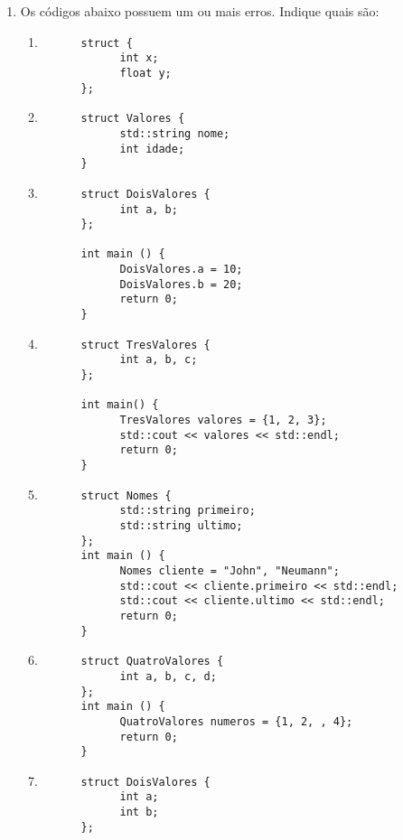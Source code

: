 \documentclass[12pt]{article}
\begin{document}
\begin{enumerate}
      \item Os códigos abaixo possuem um ou mais erros. Indique quais são:
            \begin{enumerate}
                  \item \begin{verbatim}
      struct {
            int x; 
            float y;
      };
                  \end{verbatim}
                  \item \begin{verbatim}
      struct Valores { 
            std::string nome;
            int idade;
      }
                  \end{verbatim}
                  \item \begin{verbatim}
      struct DoisValores {  
            int a, b;
      }; 
      
      int main () {  
            DoisValores.a = 10; 
            DoisValores.b = 20; 
            return 0;
      }
                  \end{verbatim}
                  \item \begin{verbatim}
      struct TresValores {
            int a, b, c; 
      }; 
      
      int main() {
            TresValores valores = {1, 2, 3};
            std::cout << valores << std::endl; 
            return 0;
      }
                  \end{verbatim}
                  \item \begin{verbatim}
      struct Nomes {  
            std::string primeiro; 
            std::string ultimo; 
      }; 
      int main () {  
            Nomes cliente = "John", "Neumann";
            std::cout << cliente.primeiro << std::endl;
            std::cout << cliente.ultimo << std::endl;
            return 0;
      }
                  \end{verbatim}
                  \item \begin{verbatim}
      struct QuatroValores {  
            int a, b, c, d; 
      }; 
      int main () {  
            QuatroValores numeros = {1, 2, , 4}; 
            return 0; 
      }
                  \end{verbatim}
                  \item \begin{verbatim}
      struct DoisValores {  
            int a; 
            int b; 
      };


\end{verbatim}
\end{enumerate}
\end{enumerate}
\end{document}
